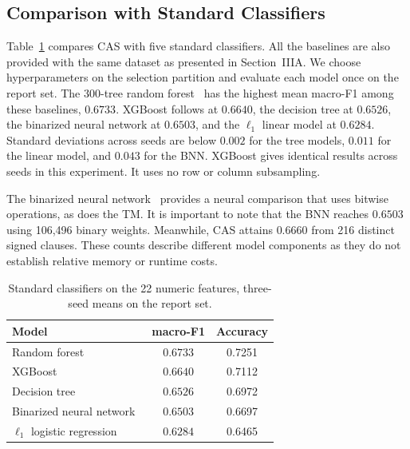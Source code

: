 \documentclass[conference]{IEEEtran}
\begin{document}
\subsection{Comparison with Standard Classifiers}
\label{sec:baselines}
Table~\ref{tab:baselines} compares CAS with five standard classifiers. All the baselines are also provided with the same dataset as presented in Section~IIIA. 
We choose
hyperparameters on the selection partition and evaluate each model once
on the report set. The 300-tree random
forest~\cite{breiman2001} has the highest mean macro-F1 among these
baselines, $0.6733$.
XGBoost follows at $0.6640$, the decision tree at $0.6526$, the
binarized neural network at $0.6503$, and the $\ell_1$ linear model at
$0.6284$. Standard deviations across seeds are below $0.002$ for the
tree models, $0.011$ for the linear model, and $0.043$ for the BNN.
XGBoost gives identical results across seeds in this experiment. It uses no row or column subsampling. 

The binarized neural network~\cite{hubara2016bnn} provides a neural
comparison that uses bitwise operations, as does the TM.
It is important to note that the BNN reaches $0.6503$ using 106,496 binary weights. Meanwhile, CAS attains
$0.6660$ from 216 distinct signed clauses. These counts describe
different model components as they do not establish relative memory or
runtime costs.






\begin{table}[t]
\centering
\caption{Standard classifiers on the 22 numeric features, three-seed
means on the report set.}
\label{tab:baselines}
\footnotesize
\setlength{\tabcolsep}{3pt}
\begin{tabular}{@{}lcc@{}}
\toprule
Model & macro-F1 & Accuracy \\
\midrule
Random forest~\cite{breiman2001} & $\mathbf{0.6733}$ & 0.7251 \\
XGBoost~\cite{chen2016xgboost} & $0.6640$ & 0.7112 \\
Decision tree & $0.6526$ & 0.6972 \\
Binarized neural network~\cite{hubara2016bnn} & $0.6503$ & 0.6697 \\
$\ell_1$ logistic regression~\cite{tibshirani1996} & $0.6284$ & 0.6465 \\
\bottomrule
\end{tabular}
\end{table}
\end{document}
